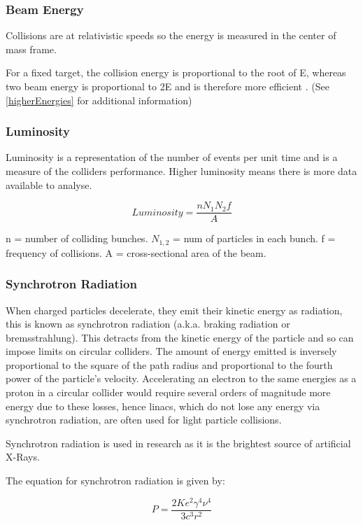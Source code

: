  \subsubsection{Beam Energy}
 
 Collisions are at relativistic speeds so the energy is measured in the center of mass frame.
 
 For a fixed target, the collision energy is proportional to the root of E, whereas two beam energy is proportional to 2E and is therefore more efficient \cite{ITP:Energy}. (See \ref{higherEnergies} for additional information)
 
 \subsubsection{Luminosity}
 
 Luminosity is a representation of the number of events per unit time and is a measure of the colliders performance. Higher luminosity means there is more data available to analyse.
 
 $$
 Luminosity = \frac{n N_1 N_2 f}{A}
 $$
 
 n = number of colliding bunches. $N_{1,2}$ = num of particles in each bunch. f = frequency of collisions. A = cross-sectional area of the beam.
 
 \subsubsection{Synchrotron Radiation}
 
 When charged particles decelerate, they emit their kinetic energy as radiation, this is known as synchrotron radiation (a.k.a. braking radiation or bremsstrahlung). 
 This detracts from the kinetic energy of the particle and so can impose limits on circular colliders. 
 The amount of energy emitted is inversely proportional to the square of the path radius and proportional to the fourth power of the particle's velocity. Accelerating an electron to the same energies as a proton in a circular collider would require several orders of magnitude more energy due to these losses, hence linacs, which do not lose any energy via synchrotron radiation, are often used for light particle collisions.
 
 Synchrotron radiation is used in research as it is the brightest source of artificial X-Rays.
 
 The equation for synchrotron radiation is given by:

\begin{equation}
    P = \frac{
        2 Ke^2 \gamma^4 \nu^4
    }{
        3 c^3 r^2
    }\end{equation}
 
